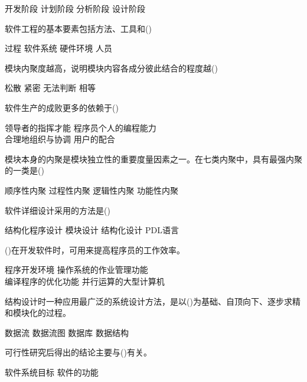 \documentclass[answers]{exam}
\begin{document}
\begin{questions}
\begin{oneparchoices}
		\choice 开发阶段
		\choice 计划阶段
		\choice 分析阶段
		\choice 设计阶段
	\end{oneparchoices}
	\question 软件工程的基本要素包括方法、工具和()\\
	\begin{oneparchoices}
		\choice 过程
		\choice 软件系统
		\choice 硬件环境
		\choice 人员
	\end{oneparchoices}
	\question 模块内聚度越高，说明模块内容各成分彼此结合的程度越()\\
	\begin{oneparchoices}
		\choice 松散
		\choice 紧密
		\choice 无法判断
		\choice 相等
	\end{oneparchoices}
	\question 软件生产的成败更多的依赖于()\\
	\begin{oneparchoices}
		\choice 领导者的指挥才能
		\choice 程序员个人的编程能力\\
		\choice 合理地组织与协调
		\choice 用户的配合
	\end{oneparchoices}
	\question 模块本身的内聚是模块独立性的重要度量因素之一。在七类内聚中，具有最强内聚的一类是()\\
	\begin{oneparchoices}
		\choice 顺序性内聚
		\choice 过程性内聚
		\choice 逻辑性内聚
		\choice 功能性内聚
	\end{oneparchoices}
	\question 软件详细设计采用的方法是()\\
	\begin{oneparchoices}
		\choice 结构化程序设计
		\choice 模块设计
		\choice 结构化设计
		\choice PDL语言
	\end{oneparchoices}
	\question ()在开发软件时，可用来提高程序员的工作效率。\\
	\begin{oneparchoices}
		\choice 程序开发环境
		\choice 操作系统的作业管理功能\\
		\choice 编译程序的优化功能
		\choice 并行运算的大型计算机
	\end{oneparchoices}
	\question 结构设计时一种应用最广泛的系统设计方法，是以()为基础、自顶向下、逐步求精和模块化的过程。\\
	\begin{oneparchoices}
		\choice 数据流
		\choice 数据流图
		\choice 数据库
		\choice 数据结构
	\end{oneparchoices}
	\question 可行性研究后得出的结论主要与()有关。\\
	\begin{oneparchoices}
		\choice 软件系统目标
		\choice 软件的功能

\end{oneparchoices}
\end{questions}
\end{document}

